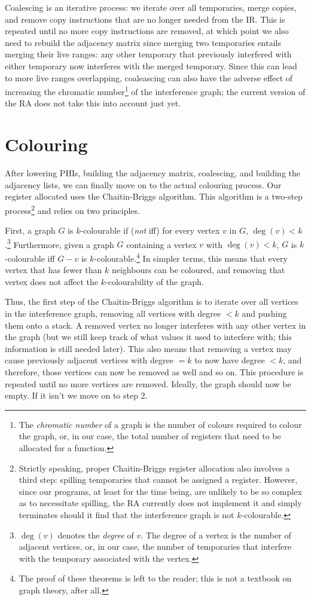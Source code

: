 \documentclass[12pt]{report}
\begin{document}
Coalescing is an iterative process: we iterate over all temporaries, merge copies, and remove copy instructions that are no longer needed
from the IR. This is repeated until no more copy instructions are removed, at which point we also need to rebuild the adjacency matrix
since merging two temporaries entails merging their live ranges: any other temporary that previously interfered with either temporary now
interferes with the merged temporary. Since this can lead to more live ranges overlapping, coaleascing can also have the adverse effect
of increasing the chromatic number\footnote{The \textit{chromatic number} of a graph is the number of colours required to colour the graph,
or, in our case, the total number of registers that need to be allocated for a function.} of the interference graph; the current version of
the RA does not take this into account just yet.

\section{Colouring}
After lowering PHIs, building the adjacency matrix, coalescing, and building the adjacency lists, we can finally move on to the actual
colouring process. Our register allocated uses the Chaitin-Briggs algorithm. This algorithm is a two-step process\footnote{Strictly
speaking, proper Chaitin-Briggs register allocation also involves a third step: spilling temporaries that cannot be assigned a register.
However, since our programs, at least for the time being, are unlikely to be so complex as to necessitate spilling, the RA currently does
not implement it and simply terminates should it find that the interference graph is not $k$-colourable.} and relies on two
principles.

First, a graph $G$ is $k$-colourable if (\textit{not} iff) for every vertex $v$ in $G$, $\deg(v) < k$.\footnote{$\deg(v)$ denotes the 
\textit{degree} of $v$. The degree of a vertex is the number of adjacent vertices, or, in our case, the number of temporaries that
interfere with the temporary associated with the vertex.} Furthermore, given a graph $G$ containing a vertex $v$ with $\deg(v) < k$,
$G$ is $k$-colourable iff $G - v$ is $k$-colourable.\footnote{The proof of these theorems is left to the reader; this is not a textbook
on graph theory, after all.} In simpler terms, this means that every vertex that has fewer than $k$ neighbours
can be coloured, and removing that vertex does not affect the $k$-colourability of the graph.

Thus, the first step of the Chaitin-Briggs algorithm is to iterate over all vertices in the interference graph, removing all vertices
with degree $< k$ and pushing them onto a stack. A removed vertex no longer interferes with any other vertex in the graph (but we still
keep track of what values it used to interfere with; this information is still needed later). This also means that removing a vertex may
cause previously adjacent vertices with degree $= k$ to now have degree $< k$, and therefore, those vertices can now be removed as well
and so on. This procedure is repeated until no more vertices are removed. Ideally, the graph should now be empty. If it isn't we move on 
to step 2.
\end{document}
